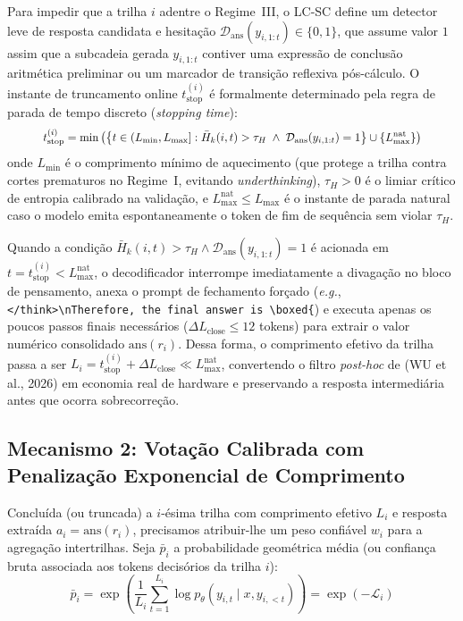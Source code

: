\documentclass[9pt,conference]{IEEEtran}
\begin{document}
Para impedir que a trilha $i$ adentre o Regime~III, o LC-SC define um detector leve de resposta candidata e hesita\c{c}\~{a}o $\mathcal{D}_{\text{ans}}(y_{i,1:t}) \in \{0, 1\}$, que assume valor $1$ assim que a subcadeia gerada $y_{i,1:t}$ contiver uma express\~{a}o de conclus\~{a}o aritm\'{e}tica preliminar ou um marcador de transi\c{c}\~{a}o reflexiva p\'{o}s-c\'{a}lculo. O instante de truncamento online $t_{\text{stop}}^{(i)}$ \'{e} formalmente determinado pela regra de parada de tempo discreto (\textit{stopping time}):
\begin{equation}
\resizebox{0.88\columnwidth}{!}{$\displaystyle t_{\text{stop}}^{(i)} = \min \left( \left\{ t \in (L_{\min}, L_{\max}] : \bar{H}_k(i, t) > \tau_H \;\wedge\; \mathcal{D}_{\text{ans}}(y_{i,1:t}) = 1 \right\} \cup \{L_{\max}^{\text{nat}}\} \right)$}
\label{eq:l_stopping}
\end{equation}
onde $L_{\min}$ \'{e} o comprimento m\'{i}nimo de aquecimento (que protege a trilha contra cortes prematuros no Regime~I, evitando \textit{underthinking}), $\tau_H > 0$ \'{e} o limiar cr\'{i}tico de entropia calibrado na valida\c{c}\~{a}o, e $L_{\max}^{\text{nat}} \le L_{\max}$ \'{e} o instante de parada natural caso o modelo emita espontaneamente o token de fim de sequ\^{e}ncia sem violar $\tau_H$.

Quando a condi\c{c}\~{a}o $\bar{H}_k(i, t) > \tau_H \wedge \mathcal{D}_{\text{ans}}(y_{i,1:t}) = 1$ \'{e} acionada em $t = t_{\text{stop}}^{(i)} < L_{\max}^{\text{nat}}$, o decodificador interrompe imediatamente a divaga\c{c}\~{a}o no bloco de pensamento, anexa o prompt de fechamento for\c{c}ado (\textit{e.g.}, \texttt{</think>\textbackslash nTherefore, the final answer is \textbackslash boxed\{}) e executa apenas os poucos passos finais necess\'{a}rios ($\Delta L_{\text{close}} \le 12$ tokens) para extrair o valor num\'{e}rico consolidado $\text{ans}(r_i)$. Dessa forma, o comprimento efetivo da trilha passa a ser $L_i = t_{\text{stop}}^{(i)} + \Delta L_{\text{close}} \ll L_{\max}^{\text{nat}}$, convertendo o filtro \textit{post-hoc} de (WU et al., 2026) em economia real de hardware e preservando a resposta intermedi\'{a}ria antes que ocorra sobrecorre\c{c}\~{a}o.

\subsection{Mecanismo 2: Vota\c{c}\~{a}o Calibrada com Penaliza\c{c}\~{a}o Exponencial de Comprimento}

Conclu\'{i}da (ou truncada) a $i$-\'{e}sima trilha com comprimento efetivo $L_i$ e resposta extra\'{i}da $a_i = \text{ans}(r_i)$, precisamos atribuir-lhe um peso confi\'{a}vel $w_i$ para a agrega\c{c}\~{a}o intertrilhas. Seja $\bar{p}_i$ a probabilidade geom\'{e}trica m\'{e}dia (ou confian\c{c}a bruta associada aos tokens decis\'{o}rios da trilha $i$):
\begin{equation}
\bar{p}_i = \exp\left( \frac{1}{L_i} \sum_{t=1}^{L_i} \log p_\theta(y_{i,t} \mid x, y_{i,<t}) \right) = \exp(-\mathcal{L}_i)
\label{eq:raw_confidence}
\end{equation}
\end{document}
